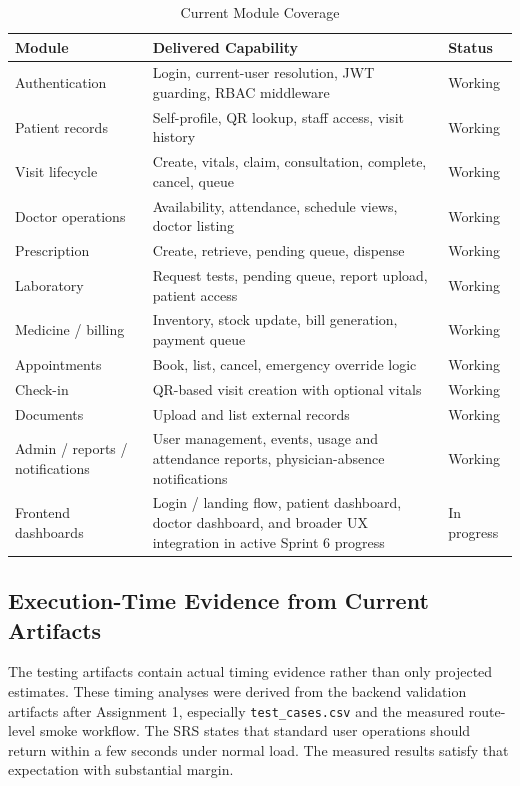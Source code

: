 \documentclass[conference]{IEEEtran}
\begin{document}
\begin{table}[!t]
\centering
\caption{Current Module Coverage}
\begin{tabular}{|p{2.05cm}|p{4.55cm}|p{1.15cm}|}
\hline
\textbf{Module} & \textbf{Delivered Capability} & \textbf{Status} \\
\hline
Authentication & Login, current-user resolution, JWT guarding, RBAC middleware & Working \\
\hline
Patient records & Self-profile, QR lookup, staff access, visit history & Working \\
\hline
Visit lifecycle & Create, vitals, claim, consultation, complete, cancel, queue & Working \\
\hline
Doctor operations & Availability, attendance, schedule views, doctor listing & Working \\
\hline
Prescription & Create, retrieve, pending queue, dispense & Working \\
\hline
Laboratory & Request tests, pending queue, report upload, patient access & Working \\
\hline
Medicine / billing & Inventory, stock update, bill generation, payment queue & Working \\
\hline
Appointments & Book, list, cancel, emergency override logic & Working \\
\hline
Check-in & QR-based visit creation with optional vitals & Working \\
\hline
Documents & Upload and list external records & Working \\
\hline
Admin / reports / notifications & User management, events, usage and attendance reports, physician-absence notifications & Working \\
\hline
Frontend dashboards & Login / landing flow, patient dashboard, doctor dashboard, and broader UX integration in active Sprint 6 progress & In progress \\
\hline
\end{tabular}
\label{tab:modules}
\end{table}

\subsection{Execution-Time Evidence from Current Artifacts}
The testing artifacts contain actual timing evidence rather than only projected estimates. These timing analyses were derived from the backend validation artifacts after Assignment 1, especially \texttt{test\_cases.csv} and the measured route-level smoke workflow. The SRS states that standard user operations should return within a few seconds under normal load. The measured results satisfy that expectation with substantial margin.
\end{document}
